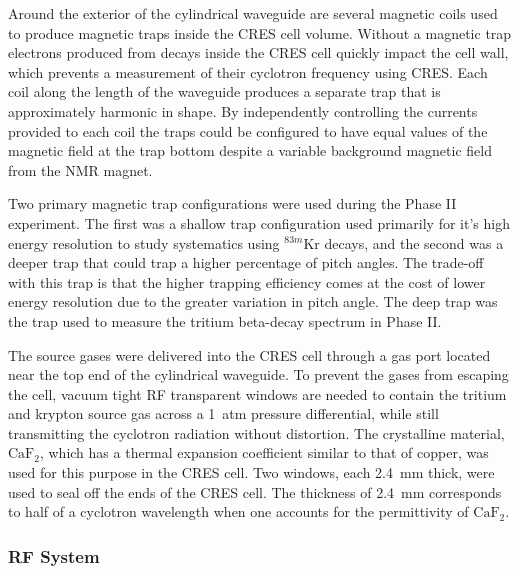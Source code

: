 Around the exterior of the cylindrical waveguide are several magnetic coils used to produce magnetic traps inside the CRES cell volume. Without a magnetic trap electrons produced from decays inside the CRES cell quickly impact the cell wall, which prevents a measurement of their cyclotron frequency using CRES. Each coil along the length of the waveguide produces a separate trap that is approximately harmonic in shape. By independently controlling the currents provided to each coil the traps could be configured to have equal values of the magnetic field at the trap bottom despite a variable background magnetic field from the NMR magnet. 

Two primary magnetic trap configurations were used during the Phase II experiment. The first was a shallow trap configuration used primarily for it's high energy resolution to study systematics using $^{83m}$Kr decays, and the second was a deeper trap that could trap a higher percentage of pitch angles. The trade-off with this trap is that the higher trapping efficiency comes at the cost of lower energy resolution due to the greater variation in pitch angle. The deep trap was the trap used to measure the tritium beta-decay spectrum in Phase II.

The source gases were delivered into the CRES cell through a gas port located near the top end of the cylindrical waveguide. To prevent the gases from escaping the cell, vacuum tight RF transparent windows are needed to contain the tritium and krypton source gas across a 1~atm pressure differential, while still transmitting the cyclotron radiation without distortion. The crystalline material, $\mathrm{CaF}_2$, which has a thermal expansion coefficient similar to that of copper, was used for this purpose in the CRES cell. Two windows, each 2.4~mm thick, were used to seal off the ends of the CRES cell. The thickness of 2.4~mm corresponds to half of a cyclotron wavelength when one accounts for the permittivity of $\mathrm{CaF}_2$.

\subsubsection*{RF System}

